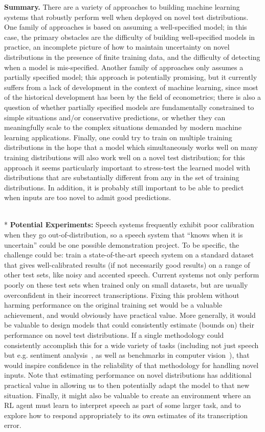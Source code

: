 \documentclass[a4paper,10pt]{article}
\begin{document}
{\bf Summary.} There are a variety of approaches to building machine learning systems that robustly perform well when deployed on novel test distributions. One family of approaches is based on assuming a well-specified model; in this case, the primary obstacles are the difficulty of building well-specified models in practice, an incomplete picture of how to maintain uncertainty on novel distributions in the presence of finite training data, and the difficulty of detecting when a model is mis-specified. Another family of approaches only assumes a partially specified model; this approach is potentially promising, but it currently suffers from a lack of development in the context of machine learning, since most of the historical development has been by the field of econometrics; there is also a question of whether partially specified models are fundamentally constrained to simple situations and/or conservative predictions, or whether they can meaningfully scale to the complex situations demanded by modern machine learning applications. Finally, one could try to train on multiple training distributions in the hope that a model which simultaneously works well on many training distributions will also work well on a novel test distribution; for this approach it seems particularly important to stress-test the learned model with distributions that are substantially different from any in the set of training distributions. In addition, it is probably still important to be able to predict when inputs are too novel to admit good predictions.

$~$\\* {\bf Potential Experiments:} Speech systems frequently exhibit poor calibration when they go out-of-distribution, so a speech system that ``knows when it is uncertain'' could be one possible demonstration project.  To be specific, the challenge could be: train a state-of-the-art speech system on a standard dataset \cite{paul1992design} that gives well-calibrated results (if not necessarily good results) on a range of other test sets, like noisy and accented speech.  Current systems not only perform poorly on these test sets when trained only on small datasets, but are usually overconfident in their incorrect transcriptions.  Fixing this problem without harming performance on the original training set would be a valuable achievement, and would obviously have practical value.  More generally, it would be valuable to design models that could consistently estimate (bounds on) their performance on novel test distributions. If a single methodology could consistently accomplish this for a wide variety of tasks (including not just speech but e.g. sentiment analysis~\cite{blitzer2007biographies}, as well as benchmarks in computer vision~\cite{torralba2011unbiased}), that would inspire confidence in the reliability of that methodology for handling novel inputs. Note that estimating performance on novel distributions has additional practical value in allowing us to then potentially adapt the model to that new situation.  Finally, it might also be valuable to create an environment where an RL agent must learn to interpret speech as part of some larger task, and to explore how to respond appropriately to its own estimates of its transcription error.
\end{document}
